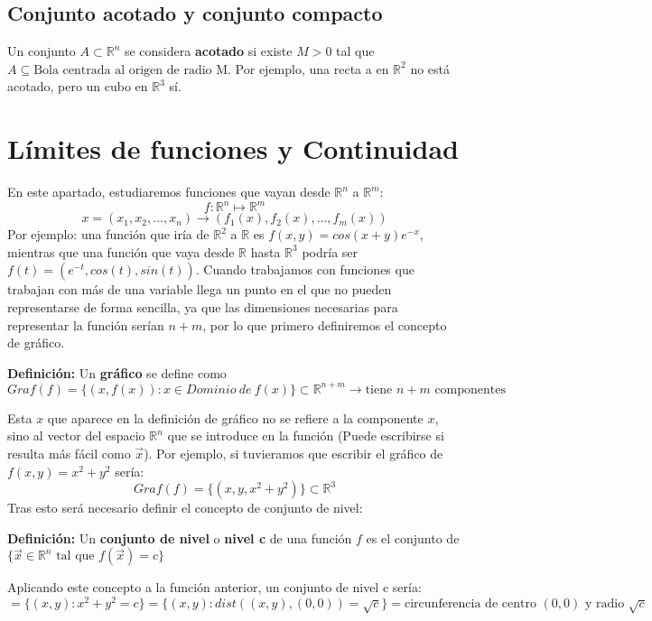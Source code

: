 \documentclass[11pt]{article}
\newcommand{\R}{\mathbb{R}}
\theoremstyle{plain}
\begin{document}
        \subsection{Conjunto acotado y conjunto compacto} %
        \label{sub:conjunto_acotado_y_conjunto_compacto}
            Un conjunto $A \subset \R^n$ se considera \textbf{acotado} si existe $M>0$ tal que $A\subseteq \text{Bola centrada al origen de radio M}$. Por ejemplo, una recta a en $\R^2$ no está acotado, pero un cubo en $\R^3$ sí.
    \section{Límites de funciones y Continuidad} %
    \label{sec:límites_de_funciones_y_continuidad}
        En este apartado, estudiaremos funciones que vayan desde $\R^n$ a $\R^m$:
        \[f: \R^n \longmapsto \R^m \]
        \[x=(x_1,x_2,...,x_n) \rightarrow (f_1(x),f_2(x),...,f_m(x))\]
        Por ejemplo: una función que iría de $\R^2$ a $\R$ es $f(x,y) = cos(x+y)e^{-x}$, mientras que una función que vaya desde $\R$ hasta $\R^3$ podría ser $f(t) = (e^{-t}, cos(t), sin(t))$. Cuando trabajamos con funciones que trabajan con más de una variable llega un punto en el que no pueden representarse de forma sencilla, ya que las dimensiones necesarias para representar la función serían $n+m$, por lo que primero definiremos el concepto de gráfico.
        \begin{center}
            \textbf{Definición:} Un \textbf{gráfico} se define como \[Graf(f) = \{(x,f(x)): x \in Dominio \ de \ f(x) \} \subset \R^{n+m} \rightarrow \text{tiene $n+m$ componentes}\]
        \end{center}
        Esta $x$ que aparece en la definición de gráfico no se refiere a la componente $x$, sino al vector del espacio $\R^n$ que se introduce en la función (Puede escribirse si resulta más fácil como $\vec{x}$). Por ejemplo, si tuvieramos que escribir el gráfico de $f(x,y) = x^2 + y ^2$ sería:
        \[Graf(f) = \{(x,y,x^2 + y^2)\} \subset \R^3\]
        Tras esto será necesario definir el concepto de conjunto de nivel:
        \begin{center}
            \textbf{Definición:} Un \textbf{conjunto de nivel} o \textbf{nivel c} de una función $f$ es el conjunto de $\{\vec{x} \in \R^n \text{ tal que } f(\vec{x}) = c \}$
        \end{center}
        Aplicando este concepto a la función anterior, un conjunto de nivel c sería: \[= \{(x,y) : x^2+y^2 = c\} = \{(x,y): dist((x,y),(0,0)) = \sqrt{c}\} = \text{circunferencia de centro $(0,0)$ y radio $\sqrt{c}$}\]
\end{document}
